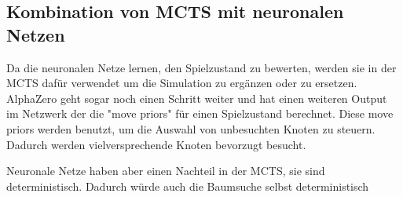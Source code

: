 \subsection{Kombination von MCTS mit neuronalen Netzen}
\label{chap:mcts-mit-nn}

Da die neuronalen Netze lernen, den Spielzustand zu bewerten, werden sie in der MCTS dafür verwendet um die Simulation zu ergänzen oder zu ersetzen.
AlphaZero geht sogar noch einen Schritt weiter und hat einen weiteren Output im Netzwerk der die "move priors" für einen Spielzustand berechnet.
Diese move priors werden benutzt, um die Auswahl von unbesuchten Knoten zu steuern.
Dadurch werden vielversprechende Knoten bevorzugt besucht.

Neuronale Netze haben aber einen Nachteil in der MCTS, sie sind deterministisch.
Dadurch würde auch die Baumsuche selbst deterministisch

